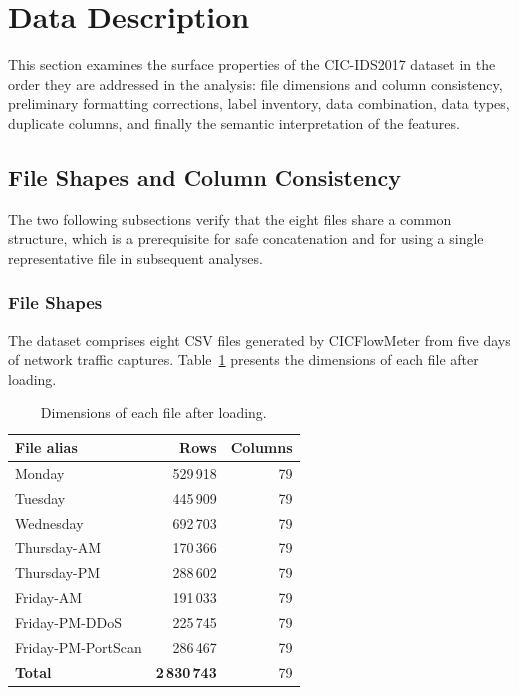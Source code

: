 \documentclass[12pt,a4paper]{article}
\begin{document}
\section{Data Description}

This section examines the surface properties of the CIC-IDS2017 dataset in the order
they are addressed in the analysis: file dimensions and column consistency, preliminary
formatting corrections, label inventory, data combination, data types, duplicate columns,
and finally the semantic interpretation of the features.

\subsection{File Shapes and Column Consistency}

The two following subsections verify that the eight files share a common structure,
which is a prerequisite for safe concatenation and for using a single representative
file in subsequent analyses.

\subsubsection{File Shapes}

The dataset comprises eight CSV files generated by CICFlowMeter from five days of
network traffic captures. Table~\ref{tab:file_shapes} presents the dimensions
of each file after loading.

\begin{table}[H]
    \centering
    \caption{Dimensions of each file after loading.}
    \label{tab:file_shapes}
    \begin{tabular}{|l|r|r|}
        \hline
        \textbf{File alias} & \textbf{Rows}        & \textbf{Columns} \\
        \hline
        Monday              & 529\,918             & 79               \\
        \hline
        Tuesday             & 445\,909             & 79               \\
        \hline
        Wednesday           & 692\,703             & 79               \\
        \hline
        Thursday-AM         & 170\,366             & 79               \\
        \hline
        Thursday-PM         & 288\,602             & 79               \\
        \hline
        Friday-AM           & 191\,033             & 79               \\
        \hline
        Friday-PM-DDoS      & 225\,745             & 79               \\
        \hline
        Friday-PM-PortScan  & 286\,467             & 79               \\
        \hline
        \textbf{Total}      & \textbf{2\,830\,743} & 79               \\
        \hline
    \end{tabular}
\end{table}
\end{document}
